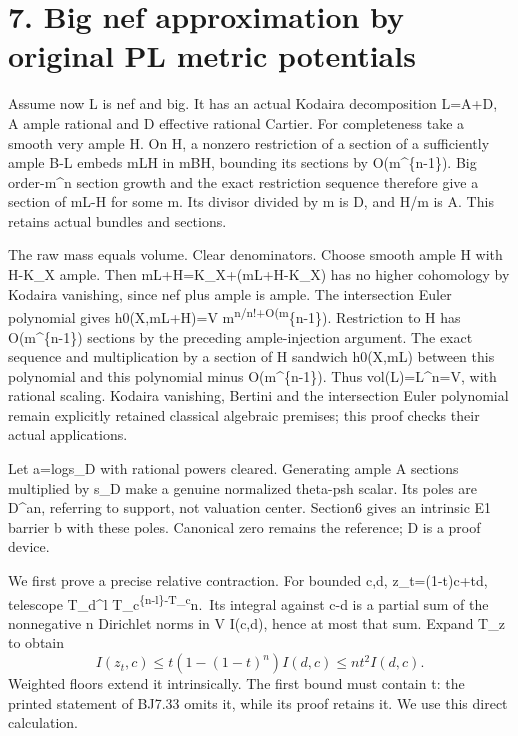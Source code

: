 \documentclass[
  10pt,
]{article}
\begin{document}
\section{7. Big nef approximation by original PL metric
potentials}\label{big-nef-approximation-by-original-pl-metric-potentials}

Assume now L is nef and big. It has an actual Kodaira decomposition
L=A+D, A ample rational and D effective rational Cartier. For
completeness take a smooth very ample H. On H, a nonzero restriction of
a section of a sufficiently ample B-L embeds mL\textbar H in
mB\textbar H, bounding its sections by O(m\^{}\{n-1\}). Big order-m\^{}n
section growth and the exact restriction sequence therefore give a
section of mL-H for some m. Its divisor divided by m is D, and H/m is A.
This retains actual bundles and sections.

The raw mass equals volume. Clear denominators. Choose smooth ample H
with H-K\_X ample. Then mL+H=K\_X+(mL+H-K\_X) has no higher cohomology
by Kodaira vanishing, since nef plus ample is ample. The intersection
Euler polynomial gives h0(X,mL+H)=V m\textsuperscript{n/n!+O(m}\{n-1\}).
Restriction to H has O(m\^{}\{n-1\}) sections by the preceding
ample-injection argument. The exact sequence and multiplication by a
section of H sandwich h0(X,mL) between this polynomial and this
polynomial minus O(m\^{}\{n-1\}). Thus vol(L)=L\^{}n=V, with rational
scaling. Kodaira vanishing, Bertini and the intersection Euler
polynomial remain explicitly retained classical algebraic premises; this
proof checks their actual applications.

Let a=log\textbar\textbar s\_D\textbar\textbar{} with rational powers
cleared. Generating ample A sections multiplied by s\_D make a genuine
normalized theta-psh scalar. Its poles are D\^{}an, referring to
support, not valuation center. Section6 gives an intrinsic E1 barrier b
with these poles. Canonical zero remains the reference; D is a proof
device.

We first prove a precise relative contraction. For bounded c,d,
z\_t=(1-t)c+td, telescope T\_d\^{}l
T\_c\textsuperscript{\{n-l\}-T\_c}n.~Its integral against c-d is a
partial sum of the nonnegative n Dirichlet norms in V I(c,d), hence at
most that sum. Expand T\_z to obtain \[
 I(z_t,c)\le t(1-(1-t)^n)I(d,c)\le nt^2 I(d,c).                          \tag{7.1}
\] Weighted floors extend it intrinsically. The first bound must contain
t: the printed statement of BJ7.33 omits it, while its proof retains it.
We use this direct calculation.
\end{document}
